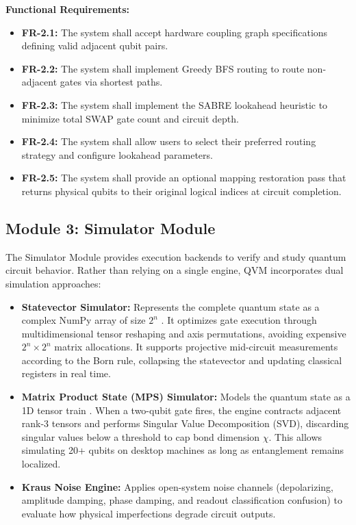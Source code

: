 \textbf{Functional Requirements:}
\begin{itemize}[leftmargin=*]
    \item \textbf{FR-2.1:} The system shall accept hardware coupling graph specifications defining valid adjacent qubit pairs.
    \item \textbf{FR-2.2:} The system shall implement Greedy BFS routing to route non-adjacent gates via shortest paths.
    \item \textbf{FR-2.3:} The system shall implement the SABRE lookahead heuristic to minimize total SWAP gate count and circuit depth.
    \item \textbf{FR-2.4:} The system shall allow users to select their preferred routing strategy and configure lookahead parameters.
    \item \textbf{FR-2.5:} The system shall provide an optional mapping restoration pass that returns physical qubits to their original logical indices at circuit completion.
\end{itemize}

\subsection{Module 3: Simulator Module}

The Simulator Module provides execution backends to verify and study quantum circuit behavior. Rather than relying on a single engine, QVM incorporates dual simulation approaches:

\begin{itemize}[leftmargin=*]
    \item \textbf{Statevector Simulator:} Represents the complete quantum state as a complex NumPy array of size $2^n$ \cite{numpy2020}. It optimizes gate execution through multidimensional tensor reshaping and axis permutations, avoiding expensive $2^n \times 2^n$ matrix allocations. It supports projective mid-circuit measurements according to the Born rule, collapsing the statevector and updating classical registers in real time.
    \item \textbf{Matrix Product State (MPS) Simulator:} Models the quantum state as a 1D tensor train \cite{vidal2003mps}. When a two-qubit gate fires, the engine contracts adjacent rank-3 tensors and performs Singular Value Decomposition (SVD), discarding singular values below a threshold to cap bond dimension $\chi$. This allows simulating 20+ qubits on desktop machines as long as entanglement remains localized.
    \item \textbf{Kraus Noise Engine:} Applies open-system noise channels (depolarizing, amplitude damping, phase damping, and readout classification confusion) to evaluate how physical imperfections degrade circuit outputs.
\end{itemize}

